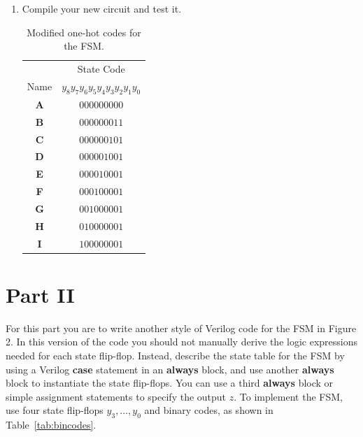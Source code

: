 \documentclass[epsfig,10pt,fullpage]{article}
\begin{document}
\begin{enumerate}
\item Compile your new circuit and test it.


\begin{table}[H]
\begin{center}
\begin{tabular}{c|c}
~ & State Code \\ 
Name & $y_8 y_7 y_6 y_5 y_4 y_3 y_2 y_1 y_0$ \\ \hline
\rule[-0.075in]{0in}{0.25in}{\bf A} & $000000000$ \\ 
{\bf B} & $000000011$ \\ 
{\bf C} & $000000101$ \\ 
{\bf D} & $000001001$ \\ 
{\bf E} & $000010001$ \\ 
{\bf F} & $000100001$ \\ 
{\bf G} & $001000001$ \\ 
{\bf H} & $010000001$ \\ 
{\bf I} & $100000001$ \\
\end{tabular}
\end{center}
\caption{Modified one-hot codes for the FSM.}
\label{tab:modified_state_assignment}
\end{table}

\end{enumerate}

\section*{Part II}
For this part you are to write another style of Verilog code for the FSM in Figure 2. In
this version of the code you should not manually derive the logic expressions needed for
each state flip-flop. Instead, describe the state table for the FSM by using a
Verilog {\bf case} statement in an {\bf always} block, and use another {\bf always} block to
instantiate the state flip-flops. You can use a third {\bf always} block or simple assignment
statements to specify the output $z$. To implement the FSM, use four state flip-flops
$y_3, \ldots, y_0$ and binary codes, as shown in Table~\ref{tab:bincodes}.
\end{document}
